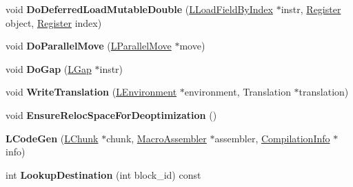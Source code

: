 \begin{DoxyCompactItemize}
\item 
void {\bfseries Do\+Deferred\+Load\+Mutable\+Double} (\hyperlink{classv8_1_1internal_1_1_l_load_field_by_index}{L\+Load\+Field\+By\+Index} $\ast$instr, \hyperlink{structv8_1_1internal_1_1_register}{Register} object, \hyperlink{structv8_1_1internal_1_1_register}{Register} index)\hypertarget{classv8_1_1internal_1_1_l_code_gen_a61dd35347ffceb77063e647c486f62d4}{}\label{classv8_1_1internal_1_1_l_code_gen_a61dd35347ffceb77063e647c486f62d4}

\item 
void {\bfseries Do\+Parallel\+Move} (\hyperlink{classv8_1_1internal_1_1_l_parallel_move}{L\+Parallel\+Move} $\ast$move)\hypertarget{classv8_1_1internal_1_1_l_code_gen_ac76d169118f379bb8eb597ec360ca6e1}{}\label{classv8_1_1internal_1_1_l_code_gen_ac76d169118f379bb8eb597ec360ca6e1}

\item 
void {\bfseries Do\+Gap} (\hyperlink{classv8_1_1internal_1_1_l_gap}{L\+Gap} $\ast$instr)\hypertarget{classv8_1_1internal_1_1_l_code_gen_a349f26d8f5d21ea5ef25e7855317a575}{}\label{classv8_1_1internal_1_1_l_code_gen_a349f26d8f5d21ea5ef25e7855317a575}

\item 
void {\bfseries Write\+Translation} (\hyperlink{classv8_1_1internal_1_1_l_environment}{L\+Environment} $\ast$environment, Translation $\ast$translation)\hypertarget{classv8_1_1internal_1_1_l_code_gen_aa6c0dc6868c8926d71543f7d35675b7f}{}\label{classv8_1_1internal_1_1_l_code_gen_aa6c0dc6868c8926d71543f7d35675b7f}

\item 
void {\bfseries Ensure\+Reloc\+Space\+For\+Deoptimization} ()\hypertarget{classv8_1_1internal_1_1_l_code_gen_a9e3268baf80169ef11e1dc8606d6bf7a}{}\label{classv8_1_1internal_1_1_l_code_gen_a9e3268baf80169ef11e1dc8606d6bf7a}

\item 
{\bfseries L\+Code\+Gen} (\hyperlink{classv8_1_1internal_1_1_l_chunk}{L\+Chunk} $\ast$chunk, \hyperlink{classv8_1_1internal_1_1_macro_assembler}{Macro\+Assembler} $\ast$assembler, \hyperlink{classv8_1_1internal_1_1_compilation_info}{Compilation\+Info} $\ast$info)\hypertarget{classv8_1_1internal_1_1_l_code_gen_aed907f71b0a7b9401ce1c0c883ed449b}{}\label{classv8_1_1internal_1_1_l_code_gen_aed907f71b0a7b9401ce1c0c883ed449b}

\item 
int {\bfseries Lookup\+Destination} (int block\+\_\+id) const \hypertarget{classv8_1_1internal_1_1_l_code_gen_aed7b32e45855e787600f16ad151865c4}{}\label{classv8_1_1internal_1_1_l_code_gen_aed7b32e45855e787600f16ad151865c4}


\end{DoxyCompactItemize}
